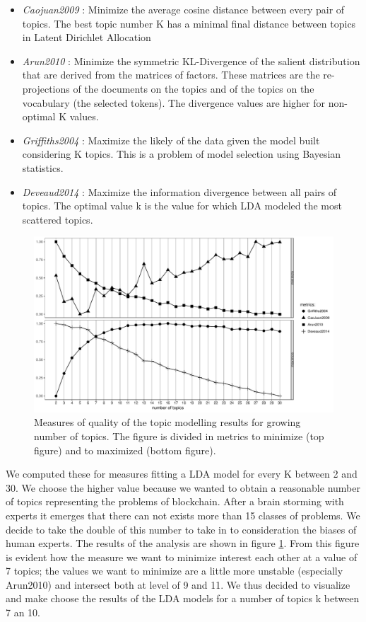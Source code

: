 \documentclass[]{book}
\providecommand{\tightlist}{%
  \setlength{\itemsep}{0pt}\setlength{\parskip}{0pt}}
\begin{document}
\begin{itemize}
\tightlist
\item
  \emph{Caojuan2009} \citep{cao2009density}: Minimize the average cosine
  distance between every pair of topics. The best topic number K has a
  minimal final distance between topics in Latent Dirichlet Allocation
\item
  \emph{Arun2010} \citep{arun2010finding}: Minimize the symmetric
  KL-Divergence of the salient distribution that are derived from the
  matrices of factors. These matrices are the re-projections of the
  documents on the topics and of the topics on the vocabulary (the
  selected tokens). The divergence values are higher for non-optimal K
  values.
\item
  \emph{Griffiths2004} \citep{griffiths2004finding}: Maximize the likely
  of the data given the model built considering K topics. This is a
  problem of model selection using Bayesian statistics.
\item
  \emph{Deveaud2014} \citep{deveaud2014accurate}: Maximize the
  information divergence between all pairs of topics. The optimal value
  k is the value for which LDA modeled the most scattered topics.
\end{itemize}

\begin{figure}

{\centering \includegraphics[width=0.6\linewidth]{_bookdown_files/figures/FindTopicsNumber_plot_bl} 

}

\caption{Measures of quality of the topic modelling results for growing number of topics. The figure is divided in metrics to minimize (top figure) and to maximized (bottom figure).}\label{fig:topicnumsmbl}
\end{figure}

We computed these for measures fitting a LDA model for every K between 2
and 30. We choose the higher value because we wanted to obtain a
reasonable number of topics representing the problems of blockchain.
After a brain storming with experts it emerges that there can not exists
more than 15 classes of problems. We decide to take the double of this
number to take in to consideration the biases of human experts. The
results of the analysis are shown in figure \ref{fig:topicnumsmbl}. From
this figure is evident how the measure we want to minimize interest each
other at a value of 7 topics; the values we want to minimize are a
little more unstable (especially Arun2010) and intersect both at level
of 9 and 11. We thus decided to visualize and make choose the results of
the LDA models for a number of topics k between 7 an 10.
\end{document}
